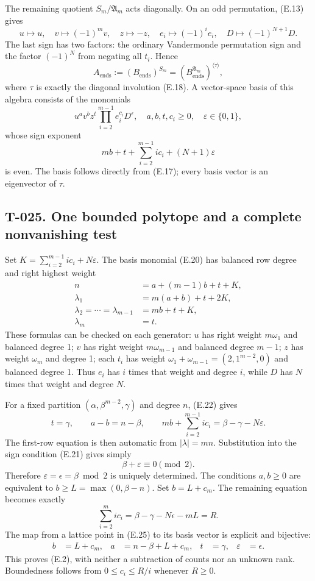 \documentclass[
  10pt,
]{article}
\begin{document}
The remaining quotient \(S_m/\mathfrak A_m\) acts diagonally. On an odd
permutation, (E.13) gives \[
u\longmapsto u,\quad v\longmapsto(-1)^m v,\quad
z\longmapsto-z,\quad e_i\longmapsto(-1)^i e_i,
\quad D\longmapsto(-1)^{N+1}D.
\tag{E.18}
\] The last sign has two factors: the ordinary Vandermonde permutation
sign and the factor \((-1)^N\) from negating all \(t_i\). Hence \[
\boxed{A_{\mathrm{ends}}:=(B_{\mathrm{ends}})^{S_m}
=(B_{\mathrm{ends}}^{\mathfrak A_m})^{\langle\tau\rangle},}
\tag{E.19}
\] where \(\tau\) is exactly the diagonal involution (E.18). A
vector-space basis of this algebra consists of the monomials \[
u^a v^b z^t\prod_{i=2}^{m-1}e_i^{c_i}D^\varepsilon,
\quad a,b,t,c_i\ge0,\quad\varepsilon\in\{0,1\},
\tag{E.20}
\] whose sign exponent \[
mb+t+\sum_{i=2}^{m-1} i c_i+(N+1)\varepsilon
\tag{E.21}
\] is even. The basis follows directly from (E.17); every basis vector
is an eigenvector of \(\tau\).

\subsection{T-025. One bounded polytope and a complete nonvanishing
test}\label{t-025.-one-bounded-polytope-and-a-complete-nonvanishing-test}

Set \(K=\sum_{i=2}^{m-1}i c_i+N\varepsilon\). The basis monomial (E.20)
has balanced row degree and right highest weight \[
\begin{aligned}
n&=a+(m-1)b+t+K,\\
\lambda_1&=m(a+b)+t+2K,\\
\lambda_2=\cdots=\lambda_{m-1}&=mb+t+K,\\
\lambda_m&=t.
\end{aligned}
\tag{E.22}
\] These formulas can be checked on each generator: \(u\) has right
weight \(m\omega_1\) and balanced degree 1; \(v\) has right weight
\(m\omega_{m-1}\) and balanced degree \(m-1\); \(z\) has weight
\(\omega_m\) and degree 1; each \(t_i\) has weight
\(\omega_1+\omega_{m-1}=(2,1^{m-2},0)\) and balanced degree 1. Thus
\(e_i\) has \(i\) times that weight and degree \(i\), while \(D\) has
\(N\) times that weight and degree \(N\).

For a fixed partition \((\alpha,\beta^{m-2},\gamma)\) and degree \(n\),
(E.22) gives \[
t=\gamma,\qquad a-b=n-\beta,\qquad
mb+\sum_{i=2}^{m-1}i c_i=\beta-\gamma-N\varepsilon.
\tag{E.23}
\] The first-row equation is then automatic from \(|\lambda|=mn\).
Substitution into the sign condition (E.21) gives simply \[
\beta+\varepsilon\equiv0\pmod2.
\tag{E.24}
\] Therefore \(\varepsilon=\epsilon=\beta\bmod2\) is uniquely
determined. The conditions \(a,b\ge0\) are equivalent to
\(b\ge L=\max(0,\beta-n)\). Set \(b=L+c_m\). The remaining equation
becomes exactly \[
\sum_{i=2}^m i c_i
=\beta-\gamma-N\epsilon-mL=R.
\tag{E.25}
\] The map from a lattice point in (E.25) to its basis vector is
explicit and bijective: \[
\begin{aligned}
b&=L+c_m, &a&=n-\beta+L+c_m, &t&=\gamma, &\varepsilon&=\epsilon.
\end{aligned}
\tag{E.26}
\] This proves (E.2), with neither a subtraction of counts nor an
unknown rank. Boundedness follows from \(0\le c_i\le R/i\) whenever
\(R\ge0\).
\end{document}

